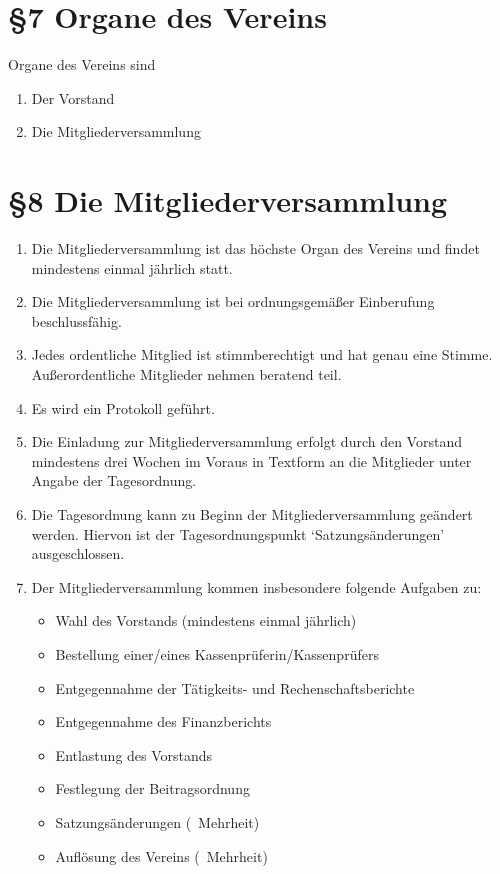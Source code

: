 \documentclass[ngerman]{article}
\begin{document}
\section*{§7 Organe des Vereins}
Organe des Vereins sind
\begin{enumerate}
 \item Der Vorstand
 \item Die Mitgliederversammlung
\end{enumerate}

\section*{§8 Die Mitgliederversammlung}
\begin{enumerate}
 \item Die Mitgliederversammlung ist das höchste Organ des Vereins und findet mindestens einmal jährlich statt.
 \item Die Mitgliederversammlung ist bei ordnungsgemäßer Einberufung beschlussfähig.
 \item Jedes ordentliche Mitglied ist stimmberechtigt und hat genau eine Stimme. Außerordentliche Mitglieder nehmen beratend teil.
 \item Es wird ein Protokoll geführt.
 \item Die Einladung zur Mitgliederversammlung erfolgt durch den Vorstand mindestens drei Wochen im Voraus in Textform an die Mitglieder unter Angabe der Tagesordnung.
 \item Die Tagesordnung kann zu Beginn der Mitgliederversammlung geändert werden. Hiervon ist der Tagesordnungspunkt `Satzungsänderungen' ausgeschlossen.
 \item Der Mitgliederversammlung kommen insbesondere folgende Aufgaben zu:
 \begin{itemize}
  \item Wahl des Vorstands (mindestens einmal jährlich)
  \item Bestellung einer/eines Kassenprüferin/Kassenprüfers
  \item Entgegennahme der Tätigkeits- und Rechenschaftsberichte
  \item Entgegennahme des Finanzberichts
  \item Entlastung des Vorstands
  \item Festlegung der Beitragsordnung
  \item Satzungsänderungen (\ Mehrheit)
  \item Auflösung des Vereins (\ Mehrheit)
 \end{itemize}
\end{enumerate}
\end{document}
